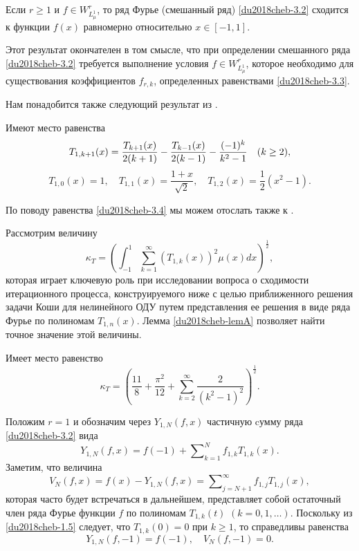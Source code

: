 \begin{theorem}\label{du2018cheb-thD}
	Если $r\ge1$ и  $f\in W^r_{L^1_\mu}$, то ряд Фурье (смешанный ряд) \eqref{du2018cheb-3.2} сходится к функции $f(x)$ равномерно относительно $x\in[-1,1]$.
\end{theorem}
Этот результат окончателен в том смысле, что при определении смешанного ряда \eqref{du2018cheb-3.2} требуется выполнение условия $f\in W^r_{L^1_\mu}$, которое необходимо для существования коэффициентов $f_{r,k}$, определенных равенствами \eqref{du2018cheb-3.3}.

Нам понадобится также следующий результат из \cite{du2018cheb-SharIzv2018}.
\begin{lemma}\label{du2018cheb-lemA}
	Имеют место равенства
	\begin{equation}\label{du2018cheb-3.4}
	T_{1,k+1}(x)={T_{k+1}(x)\over2(k+1)}- {T_{k-1}(x)\over2(k-1)} -\frac{(-1)^k}{k^2-1}\quad (k\ge 2),
	\end{equation}
	\begin{equation}\label{du2018cheb-3.5}
	T_{1,0}(x)=1, \quad T_{1,1}(x)=\frac{1+x}{\sqrt{2}}, \quad T_{1,2}(x)=\frac12(x^2-1).
	\end{equation}
\end{lemma}
По поводу равенства \eqref{du2018cheb-3.4} мы можем отослать также к  \cite{du2018cheb-Pash}.

Рассмотрим величину
\begin{equation}\label{du2018cheb-3.6}
\kappa_T=\left(\int_{-1}^1\sum_{k=1}^{\infty}(T_{1,k}(x))^2\mu(x)dx\right)^{\frac12},
\end{equation}
которая играет ключевую роль при исследовании вопроса о  сходимости итерационного процесса, конструируемого ниже с целью приближенного решения задачи Коши для    нелинейного ОДУ путем представления ее решения в виде ряда Фурье по полиномам $T_{1,n}(x)$. Лемма \ref{du2018cheb-lemA} позволяет найти точное значение этой величины.
\begin{theorem}\label{du2018cheb-th1}
	Имеет место равенство
	$$
	\kappa_ T=\left(\frac{11}{8}+\frac{\pi^2}{12}+\sum_{k=2}^\infty\frac{2}{(k^2-1)^2}\right)^\frac12.
	$$
\end{theorem}

Положим $r=1$ и обозначим через $Y_{1,N}(f,x)$ частичную cумму ряда \eqref{du2018cheb-3.2} вида
\begin{equation}\label{du2018cheb-3.12}
Y_{1,N}(f,x)= f(-1)+ \sum\nolimits_{k=1}^N  f_{1,k}T_{1,k}(x).
\end{equation}
Заметим,  что величина
\begin{equation}\label{du2018cheb-3.13}
V_N(f,x)=f(x)- Y_{1,N}(f,x)
=\sum\nolimits_{j=N+1}^\infty  f_{1,j}T_{1,j}(x),
\end{equation}
которая часто будет встречаться в дальнейшем,   представляет собой остаточный член ряда Фурье функции $f$ по полиномам $T_{1,k}(t)$ $(k=0,1,\ldots)$. Поскольку из \eqref{du2018cheb-1.5} следует, что $T_{1,k}(0)=0$ при $k\ge1$, то справедливы равенства
\begin{equation}\label{du2018cheb-3.14}
Y_{1,N}(f,-1)= f(-1),\quad V_N(f,-1)=0.
\end{equation}

